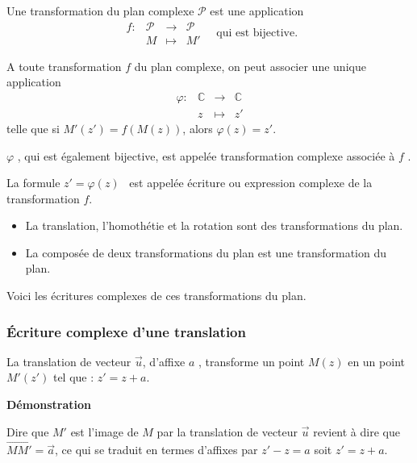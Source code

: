 
\everymath{\displaystyle}

\begin{definition}
Une transformation du plan complexe $ \mathcal{P} $ est une application 
 \[ \begin{array}{lrcl}
  f : & \mathcal{P} &   \longrightarrow & \mathcal{P} \\ 
  &  M & \longmapsto & M'
  \end{array}\quad \text{qui est bijective}.\]
\end{definition}
\medskip

A toute transformation $ f $ du plan complexe, on peut associer une unique application
\[ \begin{array}{lrcl}
  \varphi : & \mathbb{C}&   \longrightarrow & \mathbb{C}\\ 
  &  z& \longmapsto & z'
  \end{array}\] telle que si  $M'( z') = f(M( z ))$, alors \; $\varphi( z ) = z'$.
\medskip

$ \varphi $ , qui est également bijective, est appelée transformation complexe associée à $ f $ .

 La formule   $z'=\varphi (z ) $ \, est appelée écriture ou expression complexe de la transformation $ f $.
\medskip

\begin{example}
\begin{itemize}
\item
La translation, l'homothétie et la rotation sont des transformations du plan.
\item La composée de deux transformations  du plan est une transformation du plan.
\end{itemize}
\end{example}
Voici les écritures complexes de ces transformations du plan.
\subsubsection*{Écriture complexe d'une translation}
\begin{theorem}
La translation de vecteur  $ \overrightarrow{u} $, d'affixe $ a $ ,
transforme un point   $M( z ) $ en un point  $M'( z') $ tel que :  $z'=z +a  $.
\end{theorem}

\textbf{Démonstration}

\medskip

 Dire que $ M' $ est l'image de $ M $ par la translation de vecteur $ \overrightarrow{u} $  revient à dire
que  $ \overrightarrow{M M'} = \overrightarrow{a}$, ce qui se traduit en termes d'affixes par  $z'-z =a  $ soit  $z'=z +a  $. 



